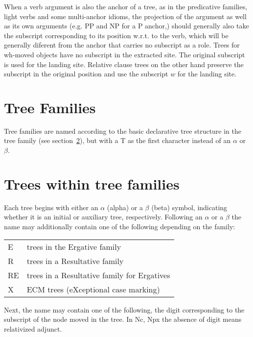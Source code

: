 When a verb argument is also the anchor of a tree, 
as in the predicative families, light verbs and some multi-anchor idioms, 
the projection of the argument as well as its own arguments (e.g. PP and NP 
for a P anchor,) 
should generally also take the subscript corresponding to its position w.r.t. 
to the verb, which will be generally diferent from the anchor that carries 
no subscript as a role. 
Trees for wh-moved objects have no subscript in the extracted site. 
The original subscript is used for the landing site. 
Relative clause trees on the other hand 
preserve the subscript in the original position and use 
the subscript $w$ for the 
landing site. 
 
\section{Tree Families} 
Tree families are named according to the basic declarative tree structure in 
the tree family (see section~\ref{family-trees}), but with a T as the first 
character instead of an $\alpha$ or $\beta$. 
 
\section{Trees within tree families} 
\label{family-trees} 
 
Each tree begins with either an $\alpha$ (alpha) or a $\beta$ (beta) symbol, 
indicating whether it is an initial or auxiliary tree, respectively.  Following 
an $\alpha$ or a $\beta$ the name may additionally contain one of the 
following depending on the family: 
 
\begin{description} 
\item\begin{tabular}{ll} 
E& trees in the Ergative family\\ 
R& trees in a Resultative family\\ 
RE& trees in a Resultative family for Ergatives\\ 
X&ECM trees (eXceptional case marking)\\ 
\end{tabular} 
\end{description} 
 
\noindent Next, the name may contain one of the following, 
the digit corresponding to the subscript of the node moved in the 
tree. In Nc, Npx the absence of digit means relativized adjunct. 
 
